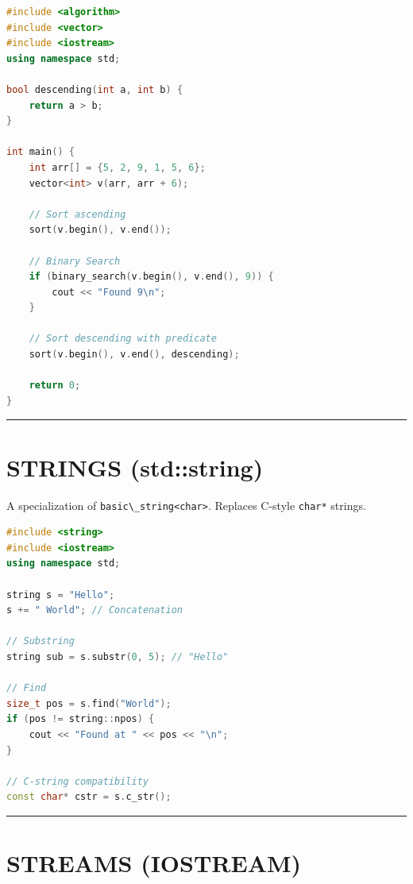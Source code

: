 \begin{lstlisting}[language={C++}]
#include <algorithm>
#include <vector>
#include <iostream>
using namespace std;

bool descending(int a, int b) {
    return a > b;
}

int main() {
    int arr[] = {5, 2, 9, 1, 5, 6};
    vector<int> v(arr, arr + 6);

    // Sort ascending
    sort(v.begin(), v.end());

    // Binary Search
    if (binary_search(v.begin(), v.end(), 9)) {
        cout << "Found 9\n";
    }

    // Sort descending with predicate
    sort(v.begin(), v.end(), descending);

    return 0;
}
\end{lstlisting}

\begin{center}\rule{0.5\linewidth}{0.5pt}\end{center}

\hypertarget{strings-stdstring}{%
\section{STRINGS (std::string)}\label{strings-stdstring}}

A specialization of \passthrough{\lstinline!basic\_string<char>!}.
Replaces C-style \passthrough{\lstinline!char*!} strings.

\begin{lstlisting}[language={C++}]
#include <string>
#include <iostream>
using namespace std;

string s = "Hello";
s += " World"; // Concatenation

// Substring
string sub = s.substr(0, 5); // "Hello"

// Find
size_t pos = s.find("World");
if (pos != string::npos) {
    cout << "Found at " << pos << "\n";
}

// C-string compatibility
const char* cstr = s.c_str();
\end{lstlisting}

\begin{center}\rule{0.5\linewidth}{0.5pt}\end{center}

\hypertarget{streams-iostream}{%
\section{STREAMS (IOSTREAM)}\label{streams-iostream}}

